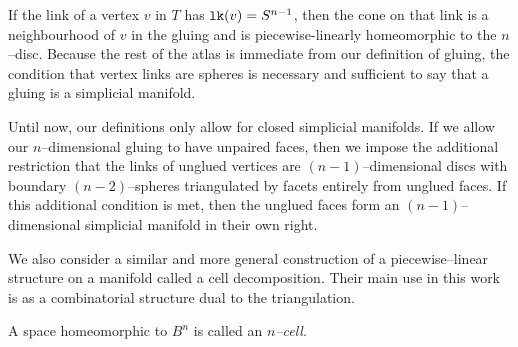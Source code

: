 \begin{defn}
\end{defn}

If the link of a vertex $v$ in $T$ has $\texttt{lk}(v)=S^{n-1}$, then the cone on that link is a neighbourhood of $v$ in the gluing and is piecewise-linearly homeomorphic to the $n$--disc.
Because the rest of the atlas is immediate from our definition of gluing, the condition that vertex links are spheres is necessary and sufficient to say that a gluing is a simplicial manifold.

Until now, our definitions only allow for closed simplicial manifolds.
If we allow our $n$--dimensional gluing to have unpaired faces, then we impose the additional restriction that the links of unglued vertices are $(n-1)$--dimensional discs with boundary $(n-2)$--spheres triangulated by facets entirely from unglued faces.
If this additional condition is met, then the unglued faces form an $(n-1)$--dimensional simplicial manifold in their own right.

We also consider a similar and more general construction of a piecewise--linear structure on a manifold called a cell decomposition.
Their main use in this work is as a combinatorial structure dual to the triangulation.

\begin{defn}
  A space homeomorphic to $B^n$ is called an \emph{$n$--cell}.
\end{defn}





